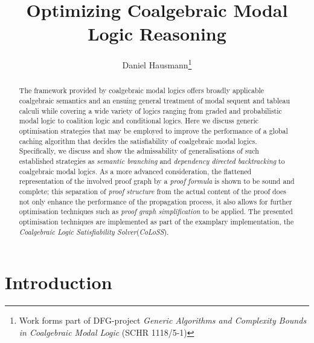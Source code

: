 \documentclass{llncs}
\begin{document}
\begin{frontmatter}
  \title{Optimizing Coalgebraic Modal Logic Reasoning}
  \author{Daniel Hausmann\thanks{Work forms part of DFG-project \emph{Generic Algorithms and Complexity
      Bounds in Coalgebraic Modal Logic} (SCHR 1118/5-1)}}
\maketitle
\end{frontmatter}

\begin{abstract} 
The framework provided by coalgebraic modal logics offers
broadly applicable coalgebraic semantics and an ensuing general
treatment of modal sequent and tableau calculi while covering a wide
variety of logics ranging from graded and probabilistic modal logic
to coalition logic and conditional logics. Here we discuss generic optimisation
strategies that may be employed to improve the performance of a global
caching algorithm that decides the satisfiability of coalgebraic modal logics.
Specifically, we discuss and show the admissability of generalisations of such
established strategies as \emph{semantic branching} and \emph{dependency directed backtracking}
to coalgebraic modal logics. As a more advanced consideration, the flattened
representation of the involved proof graph by a \emph{proof formula} is shown to be
sound and complete; this separation of \emph{proof structure} from the actual content of
the proof does not only enhance the performance of the propagation
process, it also allows for further optimisation techniques such as
\emph{proof graph simplification} to be applied. The presented optimisation
techniques are implemented as part of the examplary implementation, the
\emph{Coalgebraic Logic Satisfiability Solver}(\emph{CoLoSS}).
\end{abstract}


\section{Introduction}\label{intro}
\end{document}
